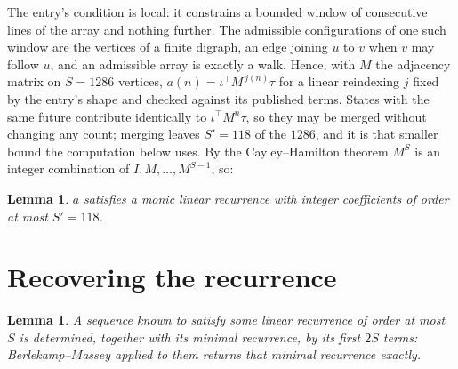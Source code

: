 \documentclass[11pt,a4paper]{article}
\theoremstyle{plain}
\newtheorem{lemma}[theorem]{Lemma}
\theoremstyle{definition}
\begin{document}
The entry's condition is local: it constrains a bounded window of consecutive lines of the
array and nothing further. The admissible configurations of one such window are the vertices
of a finite digraph, an edge joining $u$ to $v$ when $v$ may follow $u$, and an admissible
array is exactly a walk. Hence, with $M$ the adjacency matrix on $S=1286$ vertices,
$a(n)=\iota^{\!\top}M^{\,j(n)}\tau$ for a linear reindexing $j$ fixed by the entry's shape
and checked against its published terms. States with the same future contribute identically to $\iota^{\!\top}M^n\tau$, so they may be merged without changing any count; merging leaves $S'=118$ of the $1286$, and it is that smaller bound the computation below uses. By the Cayley--Hamilton theorem $M^{S}$ is an
integer combination of $I,M,\dots,M^{S-1}$, so:

\begin{lemma}\label{lem:cf}
$a$ satisfies a monic linear recurrence with integer coefficients of order at most
$S'=118$.
\end{lemma}

\section{Recovering the recurrence}

\begin{lemma}\label{lem:bm}
A sequence known to satisfy some linear recurrence of order at most $S$ is determined, together
with its minimal recurrence, by its first $2S$ terms: Berlekamp--Massey applied to them returns
that minimal recurrence exactly.
\end{lemma}
\end{document}
